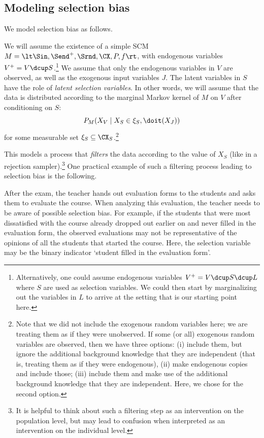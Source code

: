 \subsection{Modeling selection bias}

We model selection bias as follows. 
\begin{Not}
We will assume the existence of a simple SCM $M = \lt \Sin, \Send^+, \Srnd, \CX, P, f \rt$, with endogenous variables $V^+ = V \dcup S$.\footnote{Alternatively, one could assume endogenous variables $V^+ = V \dcup S \dcup L$ where $S$ are used as selection variables. We could then start by marginalizing out the variables in $L$ to arrive at the setting that is our starting point here.}
We assume that only the endogenous variables in $V$ are observed, as well as the exogenous input variables $J$.
The latent variables in $S$ have the role of \emph{latent selection variables}.
In other words, we will assume that the data is distributed according to the marginal Markov kernel of $M$ on $V$ after conditioning on $S$:
$$P_M(X_V \mid X_S \in \xi_S, \doit(X_J))$$
for some measurable set $\xi_S \subseteq \CX_S$.\footnote{Note that we did not include the exogenous random variables here; we are treating them as if they were unobserved. If some (or all) exogenous random variables are observed, then we have three options: (i) include them, but ignore the additional background knowledge that they are independent (that is, treating them as if they were endogenous), (ii) make endogenous copies and include those; (iii) include them and make use of the additional background knowledge that they are independent. Here, we chose for the second option.}
\end{Not}
This models a process that \emph{filters} the data according to the value of $X_S$ (like in a rejection sampler).\footnote{It is helpful to think about such a filtering step as an intervention on the population level, but may lead to confusion when interpreted as an intervention on the individual level.}
One practical example of such a filtering process leading to selection bias is the following.
\begin{Eg}
  After the exam, the teacher hands out evaluation forms to the students and asks them to evaluate the course.
  When analyzing this evaluation, the teacher needs to be aware of possible selection bias.
  For example, if the students that were most dissatisfied with the course already dropped out earlier on and never filled in the evaluation form, the observed evaluations may not be representative of the opinions of all the students that started the course.
  Here, the selection variable may be the binary indicator `student filled in the evaluation form'.
\end{Eg}
  
